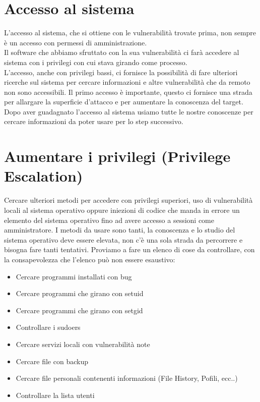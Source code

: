 \documentclass[a4paper,12pt]{article}
\begin{document}
\section{ Accesso al sistema }

L'accesso al sistema, che si ottiene con le vulnerabilità trovate prima, non sempre è un accesso con permessi di amministrazione.\\
Il software che abbiamo sfruttato con la sua vulnerabilità ci farà accedere al sistema con i privilegi con cui stava girando come processo.\\
L'accesso, anche con privilegi bassi, ci fornisce la possibilità di fare ulteriori ricerche sul sistema per cercare informazioni e altre vulnerabilità che da remoto non sono accessibili.
Il primo accesso è importante, questo ci fornisce una strada per allargare la superficie d'attacco e per aumentare la conoscenza del target.
Dopo aver guadagnato l'accesso al sistema usiamo tutte le nostre conoscenze per cercare informazioni da poter usare per lo step successivo.


\section{  Aumentare i privilegi (Privilege Escalation) }

Cercare ulteriori metodi per accedere con privilegi superiori, uso di vulnerabilità locali  al sistema operativo oppure iniezioni di codice che manda in  errore un elemento del sistema operativo fino ad avere accesso a sessioni come amministratore. I metodi da usare sono tanti, la conoscenza e lo studio del sistema operativo deve essere elevata, non c'è una sola strada da percorrere e bisogna fare tanti tentativi. 
Proviamo a fare un elenco di cose da controllare, con la consapevolezza che l'elenco può non essere esaustivo:\\
\begin{itemize}
   
  \item Cercare programmi installati con bug
  \item Cercare programmi che girano con setuid
  \item Cercare programmi che girano con setgid
  \item Controllare i sudoers
  \item Cercare servizi locali con vulnerabilità note
  \item Cercare file con backup 
  \item Cercare file personali contenenti informazioni (File History, Pofili, ecc..)
  \item Controllare la lista utenti
  
\end{itemize}
\end{document}
